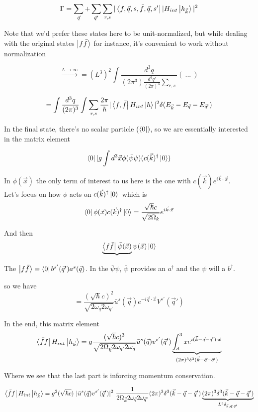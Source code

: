\documentclass[11pt]{article}
\begin{document}
		 		\[ \Gamma = \sum_{\vec{q}} +\sum_{\vec{q}'} \sum_{r,s} | \bra{f,\vec{q},s, \bar{f}, \vec{q}, s'}|H_{int} \ket{h_{\vec{k}}} |^2 \]
		 
		 Note that we'd prefer these states here to be unit-normalized, but while dealing with the original states $\ket{f \bar{f}}$ for instance, it's convenient to work without normalization
		 
		 \[ \xrightarrow{L\to \infty} = (L^3)^2 \int \frac{d^3q}{(2\pi^3) \frac{d^3 q'}{(2\pi)^3} \sum_{r,s}}  (\ ...\ )\]
		 
		 \[ = \int \frac{d^3 q}{(2\pi)^3} \int \sum_{r,s} \frac{2\pi}{\hbar} | \bra{f, \bar{f}} H_{int} \ket{h}|^2 \delta(E_{\vec{k}} - E_{\vec{q}} - E_{\vec{q}'}) \]
		 
		 In the final state, there's no scalar particle ($\bra{0})$, so we are essentially interested in the matrix element
		 
		 \[ \bra{0} | g\int d^3\vec{x} \phi(\bar{\psi}\psi) (c(\vec{k})^\dagger \ket{0})\]
		 
		 In $\phi(\vec{x})$ the only term of interest to us here is the one with $c(\vec{k}) e^{i\vec{k}\cdot\vec{x}}$.\\ Let's focus on how $\phi$ acts on $c(\vec{k})^\dagger \ket{0}$\
		 which is  \[ \bra{0}\phi(\vec{x}) c(\vec{k})^\dagger \ket{0} = \frac{\sqrt{\hbar} c}{\sqrt{2\Omega_k}} e^{i\vec{k}\cdot \vec{x}} \]
		 
		 And then \[ \underbrace{\bra{f \bar{f}}_{} \bar{\psi}(\vec{x})} \psi(\vec{x}) \ket{0} \]
		 
		 The $\ket{f \bar{f}} = \bra{0}b^{s'}(\vec{q}') a^s(\vec{q})$. In the $\bar{\psi}\psi$,  $\bar{\psi}$ provides an $a^\dagger$ and the $\psi$ will a $b^\dagger$. 
		 
		 so we have \[ = \frac{(\sqrt{\hbar}c)^2}{ \sqrt{2\omega_q 2\omega_{q'}} } \bar{u}^s (\vec{q}) e^{-i\vec{q}\cdot \vec{x}} V^{s'} (\vec{q}')\]
		 
		 In the end, this matrix element 
		 \[ \bra{\bar{f}f} H_{int} \ket{h_{\vec{k}}} = g \frac{(\sqrt{\hbar} c)^3}{\sqrt{2\Omega_{\vec{k}} 2\omega_{q'} 2\omega_{q}}} \bar{u}^s(\vec{q}) v^{s'} (\vec{q}') \underbrace{  \int_d^3 x e^{i(\vec{k}-\vec{q} - \vec{q}')\cdot\vec{x}}  }_{(2\pi)^3 \delta^3 (\vec{k} - \vec{q} - \vec{q}') } \]
		 
		 Where we see that the last part is inforcing momentum conservation. 
		 
		 \[ \bra{\bar{f}f} H_{int} \ket{h_{\vec{k}}} = g^2 (\sqrt{\hbar c})\  | \bar{u}^s(\vec{q}) v^{s'} (\vec{q}') |^2\ \frac{1}{2\Omega_{\vec{k}} 2\omega_{\vec{q}} 2\omega_{\vec{q}'}} (2\pi)^3 \delta^3 (\vec{k}-\vec{q} - \vec{q}')  \underbrace{(2\pi)^3 \delta^3 (\vec{k}-\vec{q} - \vec{q}')}_{L^3 \delta_{\vec{k}, \vec{q}, \vec{q}'}}  \]
		 
\end{document}

